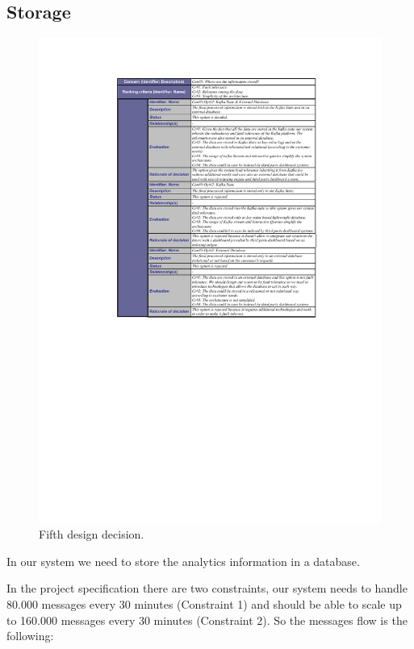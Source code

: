 \subsection{Storage}
\label{firfth_design_decision}
 \begin{figure}[H]
\centering
 \includegraphics[trim=2.5cm 8.5cm 2.5cm 1.3cm,clip=true, width=\textwidth]{dd/dd5.pdf}
\caption{Fifth design decision.}
\end{figure}

In our system we need to store the  analytics information in a database.

In the project specification there are two constraints, our system needs to handle 80.000 messages every 30 minutes (Constraint 1) and should be able to scale up to 160.000 messages every 30 minutes (Constraint 2). So the messages flow is the following:


